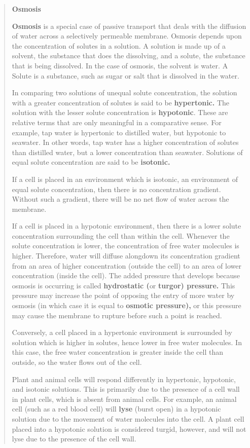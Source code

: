 \documentclass[
  letterpaper,
  DIV=11,
  numbers=noendperiod]{scrreprt}
\begin{document}
\begin{quote}
\textbf{Osmosis}

\textbf{Osmosis} is a special case of passive transport that deals with
the diffusion of water across a selectively permeable membrane. Osmosis
depends upon the concentration of solutes in a solution. A solution is
made up of a solvent, the substance that does the dissolving, and a
solute, the substance that is being dissolved. In the case of osmosis,
the solvent is water. A Solute is a substance, such as sugar or salt
that is dissolved in the water.

In comparing two solutions of unequal solute concentration, the solution
with a greater concentration of solutes is said to be
\textbf{hypertonic.} The solution with the lesser solute concentration
is \textbf{hypotonic}. These are relative terms that are only meaningful
in a comparative sense. For example, tap water is hypertonic to
distilled water, but hypotonic to seawater. In other words, tap water
has a higher concentration of solutes than distilled water, but a lower
concentration than seawater. Solutions of equal solute concentration are
said to be \textbf{isotonic.}

If a cell is placed in an environment which is isotonic, an environment
of equal solute concentration, then there is no concentration gradient.
Without such a gradient, there will be no net flow of water across the
membrane.

If a cell is placed in a hypotonic environment, then there is a lower
solute concentration surrounding the cell than within the cell. Whenever
the solute concentration is lower, the concentration of free water
molecules is higher. Therefore, water will diffuse alongdown its
concentration gradient from an area of higher concentration (outside the
cell) to an area of lower concentration (inside the cell). The added
pressure that develops because osmosis is occurring is called
\textbf{hydrostatic (}or \textbf{turgor) pressure.} This pressure may
increase the point of opposing the entry of more water by osmosis (in
which case it is equal to \textbf{osmotic pressure),} or this pressure
may cause the membrane to rupture before such a point is reached.

Conversely, a cell placed in a hypertonic environment is surrounded by
solution which is higher in solutes, hence lower in free water
molecules. In this case, the free water concentration is greater inside
the cell than outside, so the water flows out of the cell.

Plant and animal cells will respond differently in hypertonic,
hypotonic, and isotonic solutions. This is primarily due to the presence
of a cell wall in plant cells, which is absent from animal cells. For
example, an animal cell (such as a red blood cell) will \textbf{lyse}
(burst open) in a hypotonic solution due to the movement of water
molecules into the cell. A plant cell placed into a hypotonic solution
is considered turgid, however, and will not lyse due to the presence of
the cell wall.
\end{quote}
\end{document}
